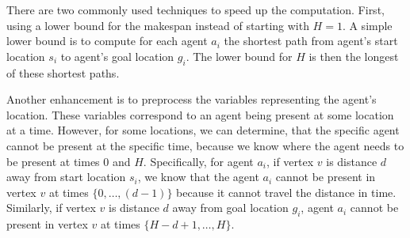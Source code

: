

There are two commonly used techniques to speed up the computation. First, using a lower bound for the makespan instead of starting with $H = 1$. A simple lower bound is to compute for each agent $a_i$ the shortest path from agent's start location $s_i$ to agent's goal location $g_i$. The lower bound for $H$ is then the longest of these shortest paths.%

Another enhancement is to pre\-pro\-cess the variables representing the agent's location. These variables correspond to an agent being present at some location at a time. However, for some locations, we can determine, that the specific agent cannot be present at the specific time, because we know where the agent needs to be present at times $0$ and $H$. Specifically, for agent $a_i$, if vertex $v$ is distance $d$ away from start location $s_i$, we know that the agent $a_i$ cannot be present in vertex $v$ at times $\{0,\dots,(d-1)\}$ because it cannot travel the distance in time. Similarly, if vertex $v$ is distance $d$ away from goal location $g_i$, agent $a_i$ cannot be present in vertex $v$ at times $\{H-d+1,\dots,H\}$. %
%
%
